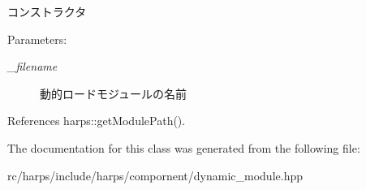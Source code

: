 コンストラクタ \begin{Desc}
\item[Parameters:]
\begin{description}
\item[{\em \_\-filename}]動的ロードモジュールの名前 \end{description}
\end{Desc}


References harps::getModulePath().

The documentation for this class was generated from the following file:\begin{CompactItemize}
\item 
rc/harps/include/harps/compornent/dynamic\_\-module.hpp\end{CompactItemize}
